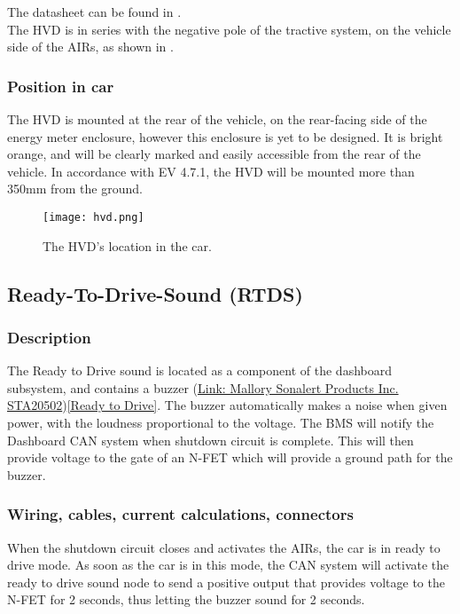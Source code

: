 \documentclass{article}
\begin{document}
The datasheet can be found in .\\

The HVD is in series with the negative pole of the tractive system, on the vehicle side of the AIRs, as shown in . 

\subsubsection{Position in car}
The HVD is mounted at the rear of the vehicle, on the rear-facing side of the energy meter enclosure, however this enclosure is yet to be designed. It is bright orange, and will be clearly marked and easily accessible from the rear of the vehicle. In accordance with EV 4.7.1, the HVD will be mounted more than 350mm from the ground.  

\begin{figure}[h]
\centering
\texttt{[image: hvd.png]}
\caption{The HVD's location in the car.}
\label{fig:hvd}
\end{figure}


\subsection{Ready-To-Drive-Sound (RTDS)}\label{ready_to_drive_sound}
\subsubsection{Description}
The Ready to Drive sound is located as a component of the dashboard subsystem, and contains a buzzer (\href{http://www.mallory-sonalert.com/specifications/STA20502.PDF}{Link: Mallory Sonalert Products Inc. STA20502})\ref{Ready to Drive}. The buzzer automatically makes a noise when given power, with the loudness proportional
to the voltage. The BMS will notify the Dashboard CAN system when shutdown circuit is complete. This will then provide voltage to the gate of an N-FET which will provide a ground path for the buzzer.
\subsubsection{Wiring, cables, current calculations, connectors}
When the shutdown circuit closes and activates the AIRs, the car is in ready to drive mode. As soon as the
car is in this mode, the CAN system will activate the ready to drive sound node to send a positive output
that provides voltage to the N-FET for 2 seconds, thus letting the buzzer sound for 2 seconds. 
\end{document}
